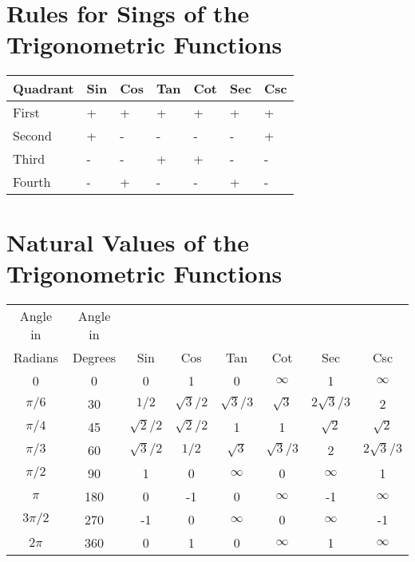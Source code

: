 \section{Rules for Sings of the Trigonometric Functions}
\label{sec:01:03}

\begin{center}
\begin{tabular}{l|llllll}
Quadrant & Sin & Cos & Tan & Cot & Sec & Csc \\ \hline
First    &	+  &	+  &	+  &	+  &	+  &	+  \\
Second   &  +  &	-  &	-  &	-  &	-  &	+  \\
Third    &	-  &	-  &	+  &	+  &	-  &	-  \\
Fourth   &  -  &	+  &	-  &	-  &	+  &  -  \\
\end{tabular}
\end{center}

\section{Natural Values of the Trigonometric Functions}
\label{sec:01:04}

\begin{center}
\begin{tabular}{cccccccc}
Angle in    &  Angle in &                &                &                &                &                  &                  \\
Radians     &   Degrees &  Sin           &  Cos           & Tan            & Cot            &   Sec            & Csc              \\  \hline
0           & 0         &  0             & 1              & 0              & $\infty$       & 1                & $\infty$         \\
$\pi / 6$   & 30        & $1 / 2$        & $\sqrt{3} / 2$ & $\sqrt{3} / 3$ & $\sqrt{3}$     & $2 \sqrt{3} / 3$ & 2                \\
$\pi / 4$   & 45        & $\sqrt{2} / 2$ & $\sqrt{2} / 2$ & 1              & 1              & $\sqrt{2}$       & $\sqrt{2}$       \\
$\pi / 3$   & 60        & $\sqrt{3} / 2$ & $1 / 2$        & $\sqrt{3}$     & $\sqrt{3} / 3$ & 2                & $2 \sqrt{3} / 3$ \\
$\pi / 2$   & 90        & 1              & 0              & $\infty$       & 0              & $\infty$         & 1                \\
$\pi$       & 180       & 0              & -1             & 0              & $\infty$       & -1               & $\infty$         \\
$3 \pi / 2$ & 270       & -1             & 0              & $\infty$       & 0              & $\infty$         & -1               \\
$2 \pi$     & 360       & 0              & 1              & 0              & $\infty$       & 1                & $\infty$         \\
\end{tabular}
\end{center}

